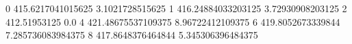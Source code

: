 0 415.6217041015625 3.1021728515625
1 416.24884033203125 3.72930908203125
2 412.51953125 0.0
4 421.48675537109375 8.96722412109375
6 419.8052673339844 7.285736083984375
8 417.8648376464844 5.345306396484375
